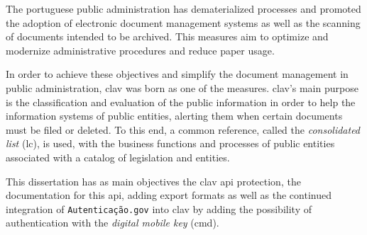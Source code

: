 The portuguese public administration has dematerialized processes and promoted the adoption of electronic document management systems as well as the scanning of documents intended to be archived. This measures aim to optimize and modernize administrative procedures and reduce paper usage.

In order to achieve these objectives and simplify the document management in public administration, \acrshort{clav} was born as one of the measures. \acrshort{clav}'s main purpose is the classification and evaluation of the public information in order to help the information systems of public entities, alerting them when certain documents must be filed or deleted. To this end, a common reference, called the \textit{consolidated list} (\acrlong{lc}), is used, with the business functions and processes of public entities associated with a catalog of legislation and entities.

This dissertation has as main objectives the \acrshort{clav} \acrshort{api} protection, the documentation for this \acrshort{api}, adding export formats as well as the continued integration of \texttt{Autenticação.gov} into \acrshort{clav} by adding the possibility of authentication with the \textit{digital mobile key} (\acrlong{cmd}).
